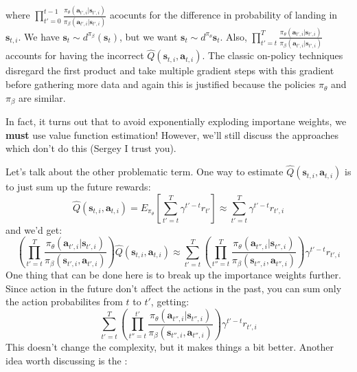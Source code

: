 \documentclass{report}
\begin{document}
where $ \prod_{t'=0}^{t-1} \frac{\pi_{ \theta } (\bm{a}_{t',i}|\bm{s}_{t',i})}{\pi_{ \beta } (\bm{a}_{t',i}|\bm{s}_{t',i})}  $
acocunts for the difference in probability of landing in $ \bm{s}_{t,i}  $.
We have $ \bm{s}_{t}\sim d^{ \pi_{ \beta } }  (\bm{s}_{t})$, but we want
$ \bm{s}_{t}\sim d^{ \pi_{ \theta } }  \bm{s}_{t}$.
Also, $ \prod_{t'=t}^{T} \frac{\pi_{ \theta } (\bm{a}_{t',i}| \bm{s}_{t',i} )}{\pi_{ \beta }(\bm{a}_{t',i}| \bm{s}_{t',i} )}  $
accounts for having the incorrect $ \hat{Q} (\bm{s}_{t,i}, \bm{a}_{t,i} )  $.
The classic on-policy techniques disregard the first product and
take multiple gradient steps with this gradient before gathering more data
and again this is justified because the policies $ \pi_{ \theta }  $ and $ \pi_{ \beta }  $ are similar.

In fact, it turns out that to avoid exponentially exploding importane weights,
we \textbf{must} use value function estimation!
However, we'll still discuss the approaches which don't do this (Sergey I trust you).

Let's talk about the other problematic term.
One way to estimate $ \hat{Q} (\bm{s}_{t,i}, \bm{a}_{t,i} )  $ is to just sum up the future rewards:
\begin{equation}
\hat{Q} (\bm{s}_{t,i}, \bm{a}_{t,i} ) = E_{ \pi_{ \theta } } \left[ \sum_{t'=t}^{T} \gamma^{ t'-t }r_{ t' } \right]  
\approx \sum_{t'=t}^{T} \gamma^{ t'-t }r_{ t',i }
\end{equation}
and we'd get:
\begin{equation}
		\left( 
\prod_{t'=t}^{T} \frac{\pi_{ \theta }(\bm{a}_{t',i}| \bm{s}_{t',i} )}{\pi_{ \beta }(\bm{s}_{t',i}, \bm{a}_{t',i} )}  
		\right) 
		\hat{Q}(\bm{s}_{t,i}, \bm{a}_{t,i} )
		\approx
		\sum_{t'=t}^{T} \left( \prod_{t''=t}^{T}  \frac{\pi_{ \theta }(\bm{a}_{t'',i}| \bm{s}_{t'',i} )}{\pi_{ \beta }(\bm{s}_{t'',i}, \bm{a}_{t'',i} )} \right) 
\gamma^{ t'-t } r_{ t',i }
\end{equation}
One thing that can be done here is to break up the importance weights further.
Since action in the future don't affect the actions in the past, you can sum only the action
probabilites from $ t  $ to $ t'  $, getting:
\begin{equation}
		\sum_{t'=t}^{T} \left( \prod_{t''=t}^{t'}  \frac{\pi_{ \theta }(\bm{a}_{t'',i}| \bm{s}_{t'',i} )}{\pi_{ \beta }(\bm{s}_{t'',i}, \bm{a}_{t'',i} )} \right) 
\gamma^{ t'-t } r_{ t',i }
\end{equation}
This doesn't change the complexity, but it makes things a bit better.
Another idea worth discussing is the :
\end{document}
